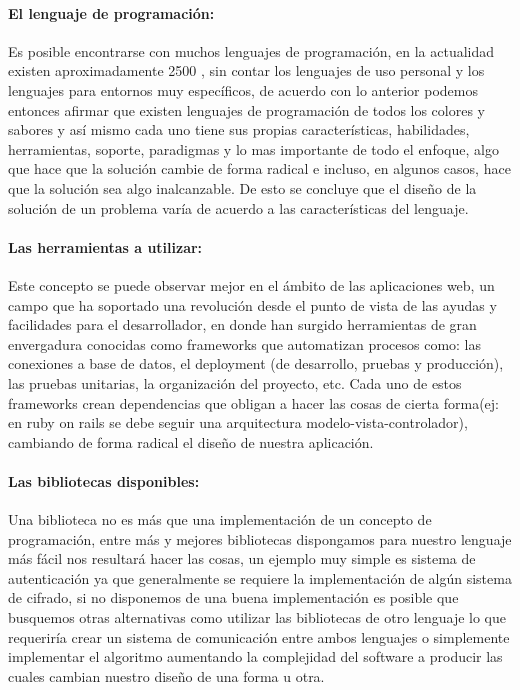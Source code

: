 \paragraph{El lenguaje de programación:}
Es posible encontrarse con muchos lenguajes de programación, en la actualidad existen aproximadamente 2500 \cite{bd_lenguajes_programacion}, sin contar los lenguajes de uso personal y los lenguajes para entornos muy específicos, de acuerdo con lo anterior podemos entonces afirmar que existen lenguajes de programación de todos los colores y sabores y así mismo cada uno tiene sus propias características, habilidades, herramientas, soporte, paradigmas y lo mas importante de todo el enfoque, algo que hace que la solución cambie de forma radical e incluso, en algunos casos, hace que la solución sea algo inalcanzable. \newline De esto se concluye que el diseño de la solución de un problema varía de acuerdo a las características del lenguaje.


\paragraph{Las herramientas a utilizar:}
Este concepto se puede observar mejor en el ámbito de las aplicaciones web, un campo que ha soportado una revolución desde el punto de vista de las ayudas y facilidades para el desarrollador, en donde han surgido herramientas de gran envergadura conocidas como frameworks que automatizan procesos como: las conexiones a base de datos, el deployment (de desarrollo, pruebas y producción), las pruebas unitarias, la organización del proyecto, etc. Cada uno de estos frameworks crean dependencias que obligan a hacer las cosas de cierta forma(ej: en ruby on rails se debe seguir una arquitectura modelo-vista-controlador), cambiando de forma radical el diseño de nuestra aplicación.

\paragraph{Las bibliotecas disponibles:}
Una biblioteca no es más que una implementación de un concepto de programación, entre más y mejores bibliotecas dispongamos para nuestro lenguaje más fácil nos resultará hacer las cosas, un ejemplo muy simple es sistema de autenticación ya que generalmente se requiere la implementación de algún sistema de cifrado, si no disponemos de una buena implementación es posible que busquemos otras alternativas como utilizar las bibliotecas de otro lenguaje lo que requeriría crear un sistema de comunicación entre ambos lenguajes o simplemente implementar el algoritmo aumentando la complejidad del software a producir las cuales cambian nuestro diseño de una forma u otra.

